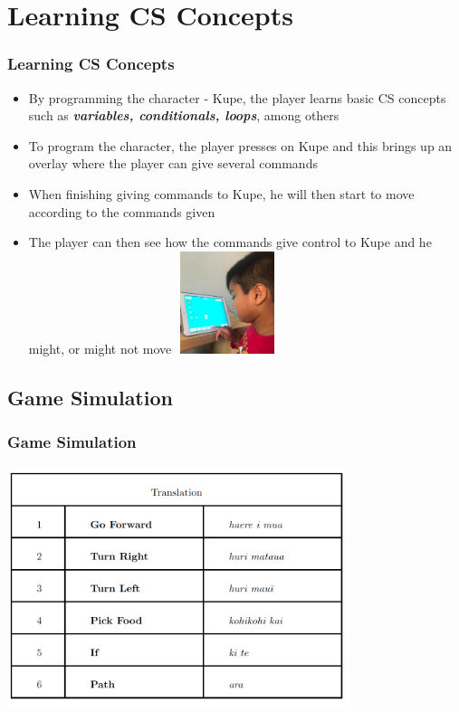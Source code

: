 \documentclass[aspectratio=169]{beamer}
\begin{document}
\section{Learning CS Concepts}
\begin{frame}
\frametitle{Learning CS Concepts}

\begin{itemize}
\item  By programming the character - Kupe, the player learns basic CS concepts such as \textbf{\textit{ variables, conditionals, loops}}, among others
\newline
\item To program the character, the player presses on Kupe and this
brings up an overlay where the player can give several commands
\newline	
\item When finishing giving commands to Kupe, he will then start to move according to the commands given
\newline	
\item The player can then see how the commands give control to Kupe and he might, or might not move 
\includegraphics[width=3cm,height=3cm]{p8.png}\\
\end{itemize}
\end{frame}

\subsection{Game Simulation}
\begin{frame}
\frametitle{Game Simulation}


\centering
\includegraphics[width=10cm,height=7cm]{p6.png}\\


\end{frame}
\end{document}
